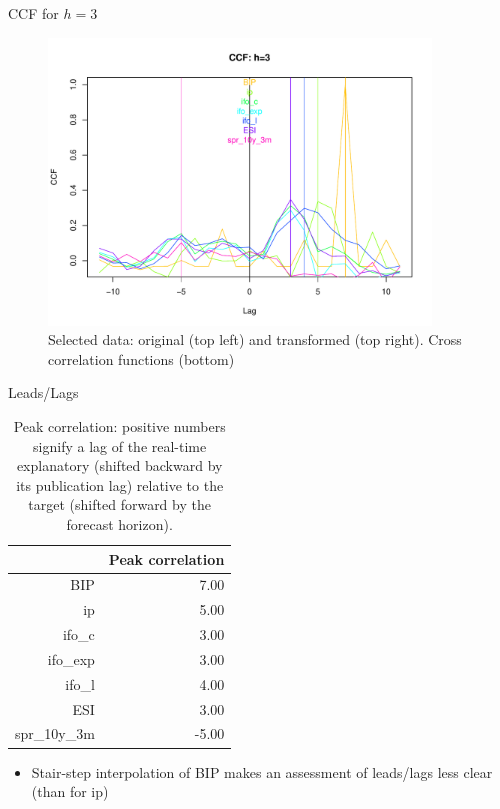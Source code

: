 \documentclass{beamer}
\begin{document}
\begin{frame} {CCF for $h=3$}\label{ccf}
\begin{figure}[H]\begin{center}\includegraphics[height=3in, width=4in]{CCF.pdf}\caption{Selected data: original (top left) and transformed (top right). Cross correlation functions (bottom) \label{cor}}\end{center}\end{figure}\end{frame}





\begin{frame} {Leads/Lags}
\begin{table}[ht]
\centering
\begin{tabular}{rr}
  \hline
 & Peak correlation \\ 
  \hline
BIP & 7.00 \\ 
  ip & 5.00 \\ 
  ifo\_c & 3.00 \\ 
  ifo\_exp & 3.00 \\ 
  ifo\_l & 4.00 \\ 
  ESI & 3.00 \\ 
  spr\_10y\_3m & -5.00 \\ 
   \hline
\end{tabular}
\caption{Peak correlation: positive numbers signify a lag of the real-time explanatory (shifted backward by its publication lag) relative to the target (shifted forward  by the forecast horizon).} 
\label{perf_var1}
\end{table}
\begin{itemize}
\item Stair-step interpolation of BIP makes an assessment of leads/lags less clear (than for ip)
\end{itemize}
\end{frame}
\end{document}
